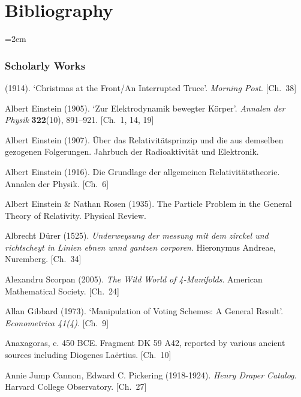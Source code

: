 \chapter*{Bibliography}

\begingroup
\raggedright
\emergencystretch=2em
\setlength{\parindent}{0pt}

\subsection*{Scholarly Works}
\vspace{0.3em}
\begin{list}{}{%
  \setlength{\leftmargin}{2em}%
  \setlength{\itemindent}{-2em}%
  \setlength{\itemsep}{0.35\baselineskip}%
  \setlength{\parsep}{0pt}%
  \setlength{\topsep}{0.5em}}
\small
\item (1914). `Christmas at the Front/An Interrupted Truce'. \textit{Morning Post}. \hfill {\scriptsize [Ch.~38]}
\item Albert Einstein (1905). `Zur Elektrodynamik bewegter Körper'. \textit{Annalen der Physik} \textbf{322}(10), 891–921. \hfill {\scriptsize [Ch.~1, 14, 19]}
\item Albert Einstein (1907). Über das Relativitätsprinzip und die aus demselben gezogenen Folgerungen. Jahrbuch der Radioaktivität und Elektronik.
\item Albert Einstein (1916). Die Grundlage der allgemeinen Relativitätstheorie. Annalen der Physik. \hfill {\scriptsize [Ch.~6]}
\item Albert Einstein \& Nathan Rosen (1935). The Particle Problem in the General Theory of Relativity. Physical Review.
\item Albrecht Dürer (1525). \textit{Underweysung der messung mit dem zirckel und richtscheyt in Linien ebnen unnd gantzen corporen}. Hieronymus Andreae, Nuremberg. \hfill {\scriptsize [Ch.~34]}
\item Alexandru Scorpan (2005). \textit{The Wild World of 4-Manifolds}. American Mathematical Society. \hfill {\scriptsize [Ch.~24]}
\item Allan Gibbard (1973). `Manipulation of Voting Schemes: A General Result'. \textit{Econometrica 41(4)}. \hfill {\scriptsize [Ch.~9]}
\item Anaxagoras, c. 450 BCE. Fragment DK 59 A42, reported by various ancient sources including Diogenes Laërtius. \hfill {\scriptsize [Ch.~10]}
\item Annie Jump Cannon, Edward C. Pickering (1918-1924). \textit{Henry Draper Catalog}. Harvard College Observatory. \hfill {\scriptsize [Ch.~27]}

\end{list}
